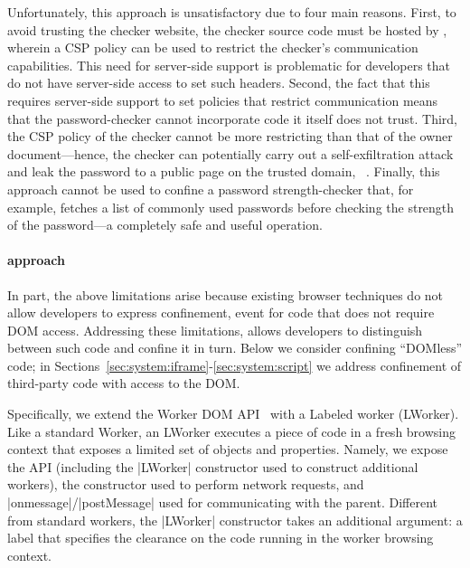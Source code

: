 Unfortunately, this approach is unsatisfactory due to four main reasons.
%
First, to avoid trusting the checker website, the checker source code
must be hosted by , wherein a CSP policy can be used
to restrict the checker's communication capabilities. 
%
This need for server-side support is problematic for developers that
do not have server-side access to set such headers.
%
Second, the fact that this requires server-side support to set
policies that restrict communication means that the password-checker
cannot incorporate code it itself does not trust.
%
Third, the CSP policy of the checker cannot be more restricting than
that of the owner document---hence, the checker can potentially carry
out a self-exfiltration attack and leak the password to a public page
on the trusted domain, ~.
%
Finally, this approach cannot be used to confine a password
strength-checker that, for example, fetches a list of commonly used
passwords before checking the strength of the password---a completely
safe and useful operation.

\paragraph{\sys{} approach}
%
In part, the above limitations arise because existing browser
techniques do not allow developers to express confinement, event for
code that does not require DOM access.
%
Addressing these limitations, \sys{} allows developers to distinguish
between such code and confine it in turn.
%
Below we consider confining ``DOMless'' code; in
Sections~\ref{sec:system:iframe}-\ref{sec:system:script} we address
confinement of third-party code with access to the DOM.

Specifically, we extend the Worker DOM API~ with a
Labeled worker (LWorker).
%
Like a standard Worker, an LWorker executes a piece of code in a fresh
browsing context that exposes a limited set of objects and properties.
%
Namely, we expose the \sys{} API (including the \js|LWorker|
constructor used to construct additional workers), the \xhr{}
constructor used to perform network requests, and
\js|onmessage|/\js|postMessage| used for communicating with the
parent.
%
Different from standard workers, the \js|LWorker| constructor takes an
additional argument: a label that specifies the clearance on the code
running in the worker browsing context.

